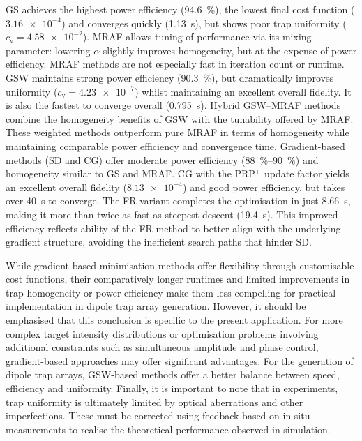 \documentclass[../Thesis-IJspeert.tex]{subfiles}
\begin{document}
GS achieves the highest power efficiency (\SI{94.6}{\percent}), the lowest final cost function ($\num{3.16e-4}$) and converges quickly (\SI{1.13}{\second}), but shows poor trap uniformity ($c_\mathrm{v} = \num{4.58e-2}$). MRAF allows tuning of performance via its mixing parameter: lowering $\alpha$ slightly improves homogeneity, but at the expense of power efficiency. MRAF methods are not especially fast in iteration count or runtime. GSW maintains strong power efficiency (\SI{90.3}{\percent}), but dramatically improves uniformity ($c_\mathrm{v} = \num{4.23e-7}$) whilst maintaining an excellent overall fidelity. It is also the fastest to converge overall (\SI{0.795}{\second}). Hybrid GSW--MRAF methods combine the homogeneity benefits of GSW with the tunability offered by MRAF. These weighted methods outperform pure MRAF in terms of homogeneity while maintaining comparable power efficiency and convergence time. Gradient-based methods (SD and CG) offer moderate power efficiency (\SIrange{88}{90}{\percent}) and homogeneity similar to GS and MRAF. CG with the PRP$^+$ update factor yields an excellent overall fidelity ($\num{8.13e-4}$) and good power efficiency, but takes over \SI{40}{\second} to converge. The FR variant completes the optimisation in just \SI{8.66}{\second}, making it more than twice as fast as steepest descent (\SI{19.4}{\second}). This improved efficiency reflects ability of the FR method to better align with the underlying gradient structure, avoiding the inefficient search paths that hinder SD.

While gradient-based minimisation methods offer flexibility through customisable cost functions, their comparatively longer runtimes and limited improvements in trap homogeneity or power efficiency make them less compelling for practical implementation in dipole trap array generation. However, it should be emphasised that this conclusion is specific to the present application. For more complex target intensity distributions or optimisation problems involving additional constraints such as simultaneous amplitude and phase control, gradient-based approaches may offer significant advantages. For the generation of dipole trap arrays, GSW-based methods offer a better balance between speed, efficiency and uniformity. Finally, it is important to note that in experiments, trap uniformity is ultimately limited by optical aberrations and other imperfections. These must be corrected using feedback based on in-situ measurements to realise the theoretical performance observed in simulation.
\end{document}
